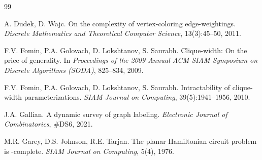 \documentclass[a4paper,11pt,dvipsnames]{elsarticle}
\begin{document}
\begin{thebibliography}{99}

 A. Dudek, D. Wajc. On the complexity of vertex-coloring edge-weightings. \emph{Discrete Mathematics and Theoretical Computer Science}, 13(3):45--50, 2011.




 F.V. Fomin, P.A. Golovach, D. Lokshtanov, S. Saurabh. Clique-width: On the price of generality. In \emph{Proceedings of the 2009 Annual ACM-SIAM Symposium on Discrete Algorithms (SODA)}, 825--834, 2009.

 F.V. Fomin, P.A. Golovach, D. Lokshtanov, S. Saurabh. Intractability of clique-width parameterizations. \emph{SIAM Journal on Computing}, 39(5):1941--1956, 2010.

 J.A. Gallian. A dynamic survey of graph labeling. \emph{Electronic Journal of Combinatorics}, \#DS6, 2021.

 M.R. Garey, D.S. Johnson, R.E. Tarjan. The planar Hamiltonian circuit problem is \np-complete. \emph{SIAM Journal on Computing}, 5(4), 1976.






\end{thebibliography}
\end{document}
